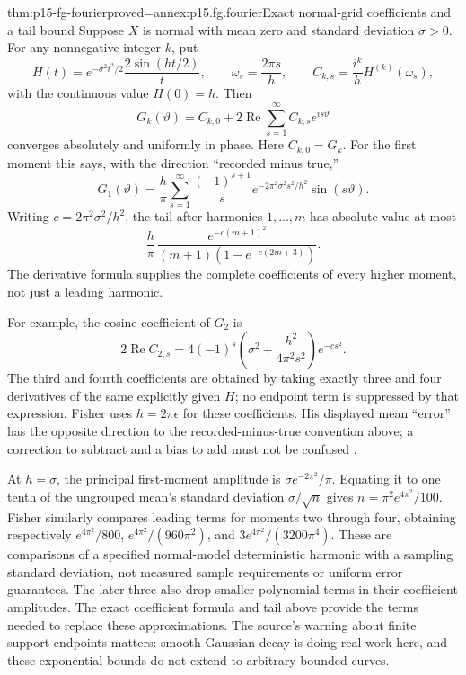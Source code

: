 \begin{hbtheorem}{thm:p15-fg-fourier}{proved=annex:p15.fg.fourier}{Exact normal-grid coefficients and a tail bound}
Suppose \(X\) is normal with mean zero and standard deviation \(\sigma>0\).
For any nonnegative integer \(k\), put
\[
 H(t)=e^{-\sigma^2t^2/2}\frac{2\sin(ht/2)}{t},\qquad
 \omega_s=\frac{2\pi s}{h},\qquad
 C_{k,s}=\frac{i^k}{h}H^{(k)}(\omega_s),
\]
with the continuous value \(H(0)=h\). Then
\[
 G_k(\vartheta)=C_{k,0}
       +2\operatorname{Re}\sum_{s=1}^{\infty}C_{k,s}e^{is\vartheta}
\]
converges absolutely and uniformly in phase. Here \(C_{k,0}=\overline G_k\).
For the first moment this says, with the direction ``recorded minus true,''
\[
 G_1(\vartheta)=\frac h\pi
  \sum_{s=1}^{\infty}\frac{(-1)^{s+1}}s
  e^{-2\pi^2\sigma^2s^2/h^2}\sin(s\vartheta).
\]
Writing \(c=2\pi^2\sigma^2/h^2\), the tail after harmonics \(1,\ldots,m\)
has absolute value at most
\[
 \frac h\pi\,
 \frac{e^{-c(m+1)^2}}{(m+1)(1-e^{-c(2m+3)})}.
\]
The derivative formula supplies the complete coefficients of every higher
moment, not just a leading harmonic.
\end{hbtheorem}

For example, the cosine coefficient of \(G_2\) is
\[
 2\operatorname{Re}C_{2,s}
 =4(-1)^s\left(\sigma^2+\frac{h^2}{4\pi^2s^2}\right)e^{-cs^2}.
\]
The third and fourth coefficients are obtained by taking exactly three
and four derivatives of the same explicitly given \(H\); no endpoint
term is suppressed by that expression. Fisher uses \(h=2\pi\epsilon\)
for these coefficients. His displayed mean ``error'' has the opposite
direction to the recorded-minus-true convention above; a correction to
subtract and a bias to add must not be confused
\cite[pp.~319--320]{Fisher1922Foundations}.

At \(h=\sigma\), the principal first-moment amplitude is
\(\sigma e^{-2\pi^2}/\pi\). Equating it to one tenth of the ungrouped
mean's standard deviation \(\sigma/\sqrt n\) gives
\(n=\pi^2e^{4\pi^2}/100\). Fisher similarly compares leading terms for
moments two through four, obtaining respectively
\(e^{4\pi^2}/800\), \(e^{4\pi^2}/(960\pi^2)\), and
\(3e^{4\pi^2}/(3200\pi^4)\). These are comparisons of a specified
normal-model deterministic harmonic with a sampling standard deviation,
not measured sample requirements or uniform error guarantees. The later
three also drop smaller polynomial terms in their coefficient amplitudes.
The exact coefficient formula and tail above provide the terms needed to
replace these approximations. The source's warning about finite support
endpoints matters: smooth Gaussian decay is doing real work here, and
these exponential bounds do not extend to arbitrary bounded curves.

